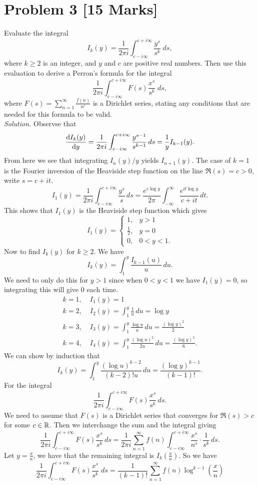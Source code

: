 \documentclass[12pt]{article}
\begin{document}
\section*{Problem 3 [15 Marks]} Evaluate the integral 
\[
    I_{k}(y)=\frac{1}{2\pi i}\int_{c-i\infty}^{c+i\infty}\frac{y^s}{s^k}\; ds,
\] 
where $k\geq 2$ is an integer, and $y$ and $c$ are positive real numbers. Then use this evaluation to derive a Perron's formula for the integral 
\[
    \frac{1}{2\pi i}\int_{c-i\infty}^{c+i\infty}F(s)\frac{x^s}{s^k}\; ds,
\] 
where $F(s)=\sum_{n=1}^{\infty}\frac{f(n)}{n^s}$ is a Dirichlet series, stating any conditions that are needed for this formula to be valid.\\
\textit{Solution.} Observse that
\[
    \frac{\mathrm{d}I_k(y)}{\mathrm{d}y}=\frac{1}{2\pi i}\int_{c-i\infty}^{c+i\infty}\frac{y^{s-1}}{s^{k-1}}\,ds=\frac{1}{y}I_{k-1}(y).
\]
From here we see that integrating $I_n(y)/y$ yields $I_{n+1}(y)$. The case of $k=1$ is the Fourier inversion of the Heaviside step function on the line $\Re(s)=c>0$, write $s=c+it$. 
\[
    I_1(y)=\frac{1}{2\pi i}\int_{c-i\infty}^{c+i\infty}\frac{y^s}{s}\,ds=\frac{e^{c\log y}}{2\pi}\int_{-\infty}^{\infty}\frac{e^{it\log y}}{c+it}\,dt.
\]
This shows that $I_1(y)$ is the Heaviside step function which gives
\[
    I_1(y)=
    \begin{cases}
        1,&y>1\\
        \frac{1}{2},&y=0\\
        0,&0<y<1.
    \end{cases}
\]
Now to find $I_k(y)$ for $k\geq2$. We have
\[
    I_k(y)=\int_{1}^{y}\frac{I_{k-1}(u)}{u}\,du.
\]
We need to only do this for $y>1$ since when $0<y<1$ we have $I_1(y)=0$, so integrating this will give 0 each time. 
\begin{align*}
    k=1,\;&I_1(y)=1\\
    k=2,\;&I_2(y)=\int_{1}^{y}\frac{1}{u}\,du=\log y\\
    k=3,\;&I_3(y)=\int_{1}^{y}\frac{\log u}{u}\,du=\frac{(\log y)^2}{2}\\
    k=4,\;&I_4(y)=\int_{1}^{y}\frac{(\log u)^2}{2u}\,du=\frac{(\log y)^3}{6}.
\end{align*}
We can show by induction that 
\[
    I_k(y)=\int_{1}^{y}\frac{(\log u)^{k-2}}{(k-2)!u}\,du=\frac{(\log y)^{k-1}}{(k-1)!}.
\]
For the integral
\[
    \frac{1}{2\pi i}\int_{c-i\infty}^{c+i\infty}F(s)\frac{x^s}{s^k}\,ds.
\]
We need to assume that $F(s)$ is a Dirichlet series that converges for $\Re(s)>c$ for some $c\in\mathbb{R}$. Then we interchange the sum and the integral giving
\[
    \frac{1}{2\pi i}\int_{c-i\infty}^{c+i\infty}F(s)\frac{x^s}{s^k}\,ds=\frac{1}{2\pi i }\sum_{n=1}^{\infty}f(n)\int_{c-i\infty}^{c+i\infty}\frac{x^s}{n^s}\cdot\frac{1}{s^k}\,ds.
\]
Let $y=\frac{x}{n}$, we have that the remaining integral is $I_k\left(\frac{x}{n}\right)$. So we have
\[
     \frac{1}{2\pi i}\int_{c-i\infty}^{c+i\infty}F(s)\frac{x^s}{s^k}\; ds=\frac{1}{(k-1)!}\sum_{n=1}^{\infty}f(n)\log^{k-1}\left(\frac{x}{n}\right)
\]
\newpage
\end{document}
